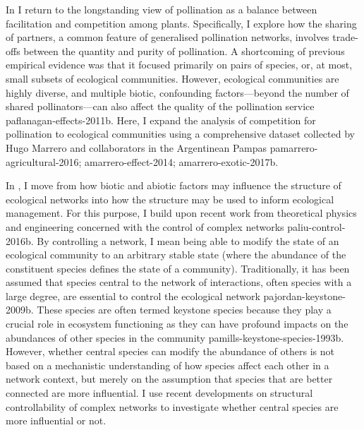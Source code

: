 \begin{refsection}
In  I return to the longstanding view of pollination as a balance between facilitation and competition among plants.
Specifically, I explore how the sharing of partners, a common feature of generalised pollination networks, involves trade-offs between the quantity and purity of pollination.
A shortcoming of previous empirical evidence was that it focused primarily on pairs of species, or, at most, small subsets of ecological communities.
However, ecological communities are highly diverse, and multiple biotic, confounding factors—beyond the number of shared pollinators—can also affect the quality of the pollination service paflanagan-effects-2011b.
Here, I expand the analysis of competition for pollination to ecological communities using a comprehensive dataset collected by Hugo Marrero and collaborators in the Argentinean Pampas pamarrero-agricultural-2016; amarrero-effect-2014; amarrero-exotic-2017b.

In , I move from how biotic and abiotic factors may influence the structure of ecological networks into how the structure may be used to inform ecological management.
For this purpose, I build upon recent work from theoretical physics and engineering concerned with the control of complex networks paliu-control-2016b.
By controlling a network, I mean being able to modify the state of an ecological community to an arbitrary stable state (where the abundance of the constituent species defines the state of a community).
Traditionally, it has been assumed that species central to the network of interactions, often species with a large degree, are essential to control the ecological network pajordan-keystone-2009b.
These species are often termed keystone species because they play a crucial role in ecosystem functioning as they can have profound impacts on the abundances of other species in the community pamills-keystone-species-1993b.
However, whether central species can modify the abundance of others is not based on a mechanistic understanding of how species affect each other in a network context, but merely on the assumption that species that are better connected are more influential.
I use recent developments on structural controllability of complex networks to investigate whether central species are more influential or not.

\end{refsection}
